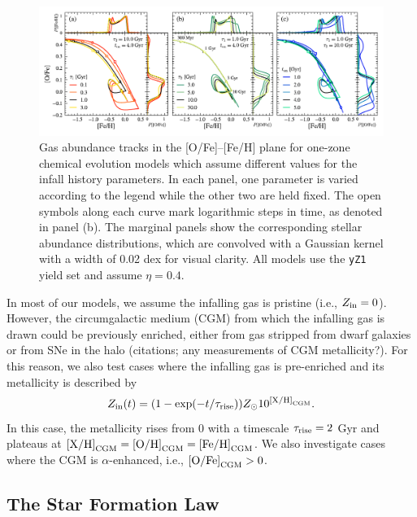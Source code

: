 \documentclass[twocolumn,twocolappendix,linenumbers]{aastex631}
\newcommand{\todo}[1]{{\color{red}#1}}
\begin{document}
\begin{figure}
    \centering
    \includegraphics{figures/onezone_params.pdf}
    \caption{Gas abundance tracks in the [O/Fe]--[Fe/H] plane for one-zone chemical evolution models which assume different values for the infall history parameters. In each panel, one parameter is varied according to the legend while the other two are held fixed. The open symbols along each curve mark logarithmic steps in time, as denoted in panel (b). The marginal panels show the corresponding stellar abundance distributions, which are convolved with a Gaussian kernel with a width of 0.02 dex for visual clarity. All models use the {\tt yZ1} yield set and assume $\eta=0.4$.}
    \label{fig:twoinfall-parameters}
\end{figure}

In most of our models, we assume the infalling gas is pristine (i.e., $Z_{\rm in}=0$). However, the circumgalactic medium (CGM) from which the infalling gas is drawn could be previously enriched, either from gas stripped from dwarf galaxies or from SNe in the halo \todo{(citations; any measurements of CGM metallicity?)}. For this reason, we also test cases where the infalling gas is pre-enriched and its metallicity is described by
\begin{equation}
    \label{eq:pre-enrichment}
    Z_{\rm in}(t) = (1 - \exp(-t/\tau_{\rm rise})) Z_\odot 10^{{\rm [X/H]}_{\rm CGM}}.
\end{equation}
In this case, the metallicity rises from 0 with a timescale $\tau_{\rm rise}=2$ Gyr and plateaus at ${\rm [X/H]}_{\rm CGM}={\rm [O/H]}_{\rm CGM}={\rm [Fe/H]}_{\rm CGM}$. We also investigate cases where the CGM is $\alpha$-enhanced, i.e., ${\rm [O/Fe]}_{\rm CGM}>0$.

\subsection{The Star Formation Law}
\label{sec:sf-law}
\end{document}
